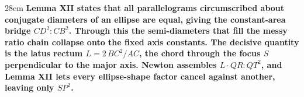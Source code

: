 \documentclass[border=4pt]{standalone}
\begin{document}
\begin{varwidth}{28em}
\large\bfseries
Lemma XII states that all parallelograms circumscribed about conjugate      diameters of an ellipse are equal, giving the constant-area bridge $CD^2 : CB^2$.      Through this the semi-diameters that fill the messy ratio chain collapse      onto the fixed axis constants. The decisive quantity is the latus rectum      $L = 2\,BC^2/AC$, the chord through the focus $S$ perpendicular to the major axis.      Newton assembles $L\cdot QR : QT^2$, and Lemma XII lets every ellipse-shape factor      cancel against another, leaving only $SP^2$.
\end{varwidth}
\end{document}
